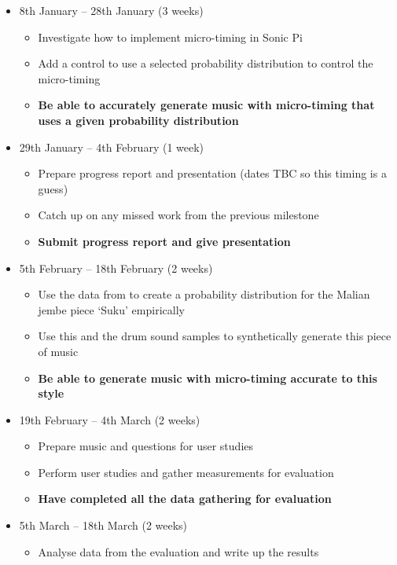 \documentclass[12pt,twoside,openright]{report}
\begin{document}
\begin{refsection}
\begin{itemize}
\begin{itemize}
    \end{itemize}
    \item 8th January -- 28th January (3 weeks)
    \begin{itemize}
    	\item Investigate how to implement micro-timing in Sonic Pi
    	\item Add a control to use a selected probability distribution to control the micro-timing
    	\item \textbf{Be able to accurately generate music with micro-timing that uses a given probability distribution}
    \end{itemize}
    \item 29th January -- 4th February (1 week)
    \begin{itemize}
    	\item Prepare progress report and presentation (dates TBC so this timing is a guess)
    	\item Catch up on any missed work from the previous milestone
    	\item \textbf{Submit progress report and give presentation}
    \end{itemize}
    \item 5th February -- 18th February (2 weeks)
    \begin{itemize}
    	\item Use the data from \cite{jacoby2021} to create a probability distribution for the Malian jembe piece `Suku' empirically
    	\item Use this and the drum sound samples to synthetically generate this piece of music
    	\item \textbf{Be able to generate music with micro-timing accurate to this style}
    \end{itemize}
    \item 19th February -- 4th March (2 weeks)
    \begin{itemize}
    	\item Prepare music and questions for user studies
    	\item Perform user studies and gather measurements for evaluation
    	\item \textbf{Have completed all the data gathering for evaluation}
    \end{itemize}
    \item 5th March -- 18th March (2 weeks)
    \begin{itemize}
    	\item Analyse data from the evaluation and write up the results

\end{itemize}
\end{itemize}
\end{refsection}
\end{document}
